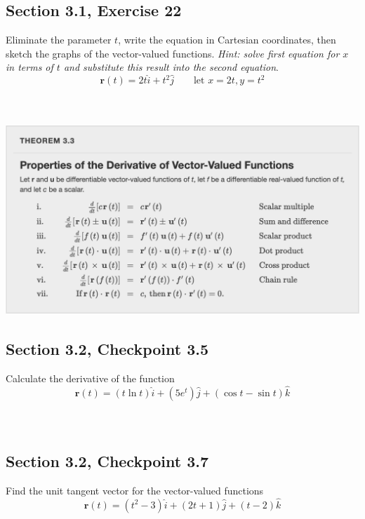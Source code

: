 \documentclass[]{mangos-musings}
\begin{document}
\subsection{Section 3.1, Exercise 22}
Eliminate the parameter $t$, write the equation in Cartesian coordinates, then sketch the graphs of the vector-valued functions. \textit{Hint: solve first equation for $x$ in terms of $t$ and substitute this result into the second equation}.
\[\mathbf{r}(t) = 2t \hat{i} + t^2 \hat{j} \qquad \text{let }x=2t, y=t^2\]
\begin{align*}
  \\ \\ \\ \\ \\ \\
\end{align*}

\begin{center}
  \includegraphics[scale=0.6]{assets/rec05-derivative-properties.png}
\end{center}

\newpage
\subsection{Section 3.2, Checkpoint 3.5}
Calculate the derivative of the function 
\[\mathbf{r}(t) = (t\ln t)\hat{i} + (5e^t)\hat{j} + (\cos t - \sin t)\hat{k}\]
\begin{align*}
  \\ \\ \\ \\ \\ \\
\end{align*}

\subsection{Section 3.2, Checkpoint 3.7}
Find the unit tangent vector for the vector-valued functions
\[\mathbf{r}(t) = (t^2-3)\hat{i} + (2t+1)\hat{j} + (t-2)\hat{k}\]
\begin{align*}
  \\ \\ \\ \\ \\ \\
\end{align*}
\end{document}
